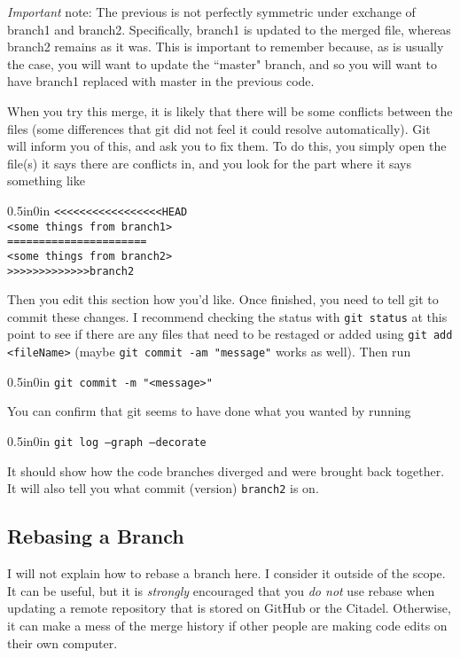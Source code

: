 \documentclass[11pt]{article}
\newcommand{\code}[1]{\begin{adjustwidth}{0.5in}{0in}
    \texttt{#1}
    \end{adjustwidth}}
\begin{document}
\emph{Important} note: The previous is not perfectly symmetric under exchange of branch1 and branch2.  Specifically, branch1 is updated to the merged file, whereas branch2 remains as it was.  This is important to remember because, as is usually the case, you will want to update the ``master" branch, and so you will want to have branch1 replaced with master in the previous code.

When you try this merge, it is likely that there will be some conflicts between the files (some differences that git did not feel it could resolve automatically).  Git will inform you of this, and ask you to fix them.  To do this, you simply open the file(s) it says there are conflicts in, and you look for the part where it says something like

\code{<<<<<<<<<<<<<<<<<HEAD\\
<some things from branch1>\\
======================\\
<some things from branch2>\\
>>>>>>>>>>>>>branch2}

Then you edit this section how you'd like.  Once finished, you need to tell git to commit these changes.  I recommend checking the status with \texttt{git status} at this point to see if there are any files that need to be restaged or added using \texttt{git add <fileName>} (maybe \texttt{git commit -am "message"} works as well).  Then run

\code{git commit -m "<message>"}

You can confirm that git seems to have done what you wanted by running 

\code{git log --graph --decorate}

It should show how the code branches diverged and were brought back together.  It will also tell you what commit (version) \texttt{branch2} is on.

\subsection{Rebasing a Branch}

I will not explain how to rebase a branch here.  I consider it outside of the scope.  It can be useful, but it is \emph{strongly} encouraged that you \emph{do not} use rebase when updating a remote repository that is stored on GitHub or the Citadel.  Otherwise, it can make a mess of the merge history if other people are making code edits on their own computer.
\end{document}
